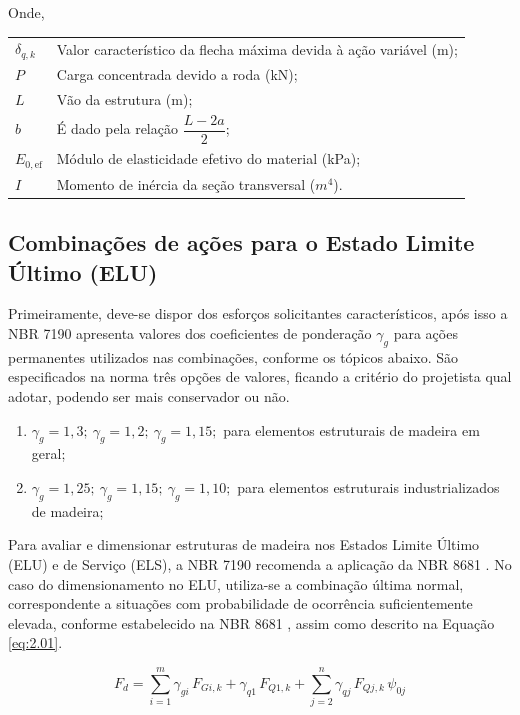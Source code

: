 Onde,

\begin{tabular}{ll}
$\delta_{q,k}$ & Valor característico da flecha máxima devida à ação variável (m);\\
$P$ & Carga concentrada devido a roda (kN);\\
$L$ & Vão da estrutura (m);\\
$b$ & É dado pela relação $\dfrac{L - 2a}{2}$;\\
$E_{0,\mathrm{ef}}$ & Módulo de elasticidade efetivo do material (kPa);\\
$I$ & Momento de inércia da seção transversal ($m^4$).
\end{tabular}

\subsection{Combinações de ações para o Estado Limite Último (ELU)}

Primeiramente, deve-se dispor dos esforços solicitantes característicos, após isso a NBR 7190 \parencite{NBR7190-1:2022} apresenta valores dos coeficientes de ponderação $\gamma_{g}$ para ações permanentes utilizados nas combinações, conforme os tópicos abaixo. São especificados na norma três opções de valores, ficando a critério do projetista qual adotar, podendo ser mais conservador ou não.

\begin{enumerate}[label=\alph*)]
    \item $\gamma_{g} = 1,3;\ \gamma_{g} = 1,2;\ \gamma_{g} = 1,15;$ para elementos estruturais de madeira em geral;
    \item $\gamma_{g} = 1,25;\ \gamma_{g} = 1,15;\ \gamma_{g} = 1,10;$ para elementos estruturais industrializados de madeira;
\end{enumerate}

Para avaliar e dimensionar estruturas de madeira nos Estados Limite Último (ELU) e de Serviço (ELS), a NBR 7190 \parencite{NBR7190-1:2022} recomenda a aplicação da NBR 8681 \parencite{NBR8681:2025}. No caso do dimensionamento no ELU, utiliza-se a combinação última normal, correspondente a situações com probabilidade de ocorrência suficientemente elevada, conforme estabelecido na NBR 8681 \parencite{NBR8681:2025} , assim como descrito na Equação \eqref{eq:2.01}.

\begin{equation}
F_d = \sum_{i=1}^{m} \gamma_{gi}\, F_{Gi,k}
      + \gamma_{q1}\, F_{Q1,k}
      + \sum_{j=2}^{n} \gamma_{qj}\, F_{Qj,k}\, \psi_{0j}
       \label{eq:2.01}
\end{equation}

